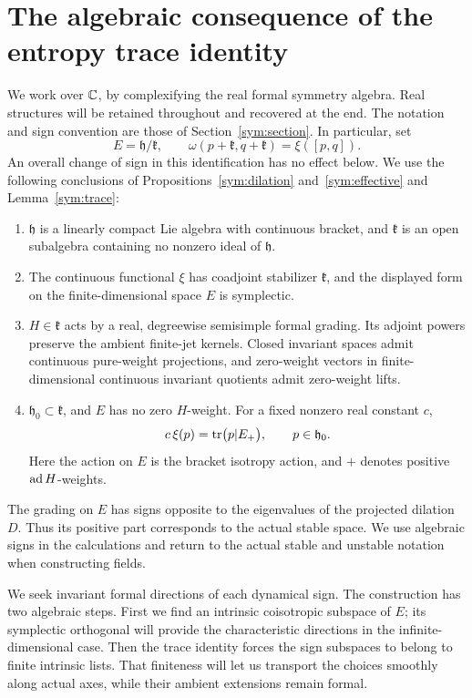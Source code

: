 \section{The algebraic consequence of the entropy trace identity}
\label{alg:section}

We work over $\mathbb C$, by complexifying the real formal symmetry algebra.
Real structures will be retained throughout and recovered at the end.
The notation and sign convention are those of Section~\ref{sym:section}.
In particular, set
\[
 E=\mathfrak h/\mathfrak k,
 \qquad
 \omega(p+\mathfrak k,q+\mathfrak k)=\xi([p,q]).
\]
An overall change of sign in this identification has no effect below.
We use the following conclusions of Propositions~\ref{sym:dilation}
and~\ref{sym:effective} and Lemma~\ref{sym:trace}:
\begin{enumerate}[label=(\roman*)]
\item $\mathfrak h$ is a linearly compact Lie algebra with continuous
bracket, and $\mathfrak k$ is an open subalgebra containing no nonzero
ideal of $\mathfrak h$.
\item The continuous functional $\xi$ has coadjoint stabilizer
$\mathfrak k$, and the displayed form on the finite-dimensional space
$E$ is symplectic.
\item $H\in\mathfrak k$ acts by a real, degreewise semisimple formal
grading. Its adjoint powers preserve the ambient finite-jet kernels.
Closed invariant spaces admit continuous pure-weight projections, and
zero-weight vectors in finite-dimensional continuous invariant quotients
admit zero-weight lifts.
\item $\mathfrak h_0\subset\mathfrak k$, and $E$ has no zero
$H$-weight. For a fixed nonzero real constant $c$,
\begin{equation}
 c\,\xi(p)=\operatorname{tr}\bigl(p|E_+\bigr),
 \qquad p\in\mathfrak h_0.
 \label{alg:entropy-trace}
\end{equation}
Here the action on $E$ is the bracket isotropy action, and $+$ denotes
positive $\operatorname{ad} H$-weights.
\end{enumerate}
The grading on $E$ has signs opposite to the eigenvalues of the projected
dilation $D$. Thus its positive part corresponds to the actual stable
space. We use algebraic signs in the calculations and return to the
actual stable and unstable notation when constructing fields.

We seek invariant formal directions of each dynamical sign. The
construction has two algebraic steps. First we find an intrinsic
coisotropic subspace of $E$; its symplectic orthogonal will provide the
characteristic directions in the infinite-dimensional case. Then the
trace identity forces the sign subspaces to belong to finite intrinsic
lists. That finiteness will let us transport the choices smoothly along
actual axes, while their ambient extensions remain formal.

